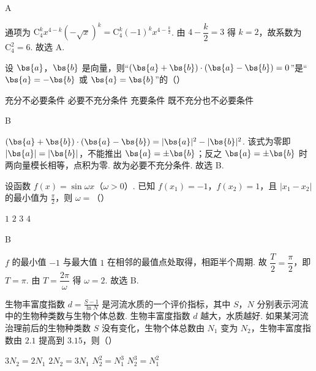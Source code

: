 \begin{answer}
A
\end{answer}

\begin{solution}
通项为 \(\mathrm C_4^k x^{4-k}(-\sqrt{x})^k=\mathrm C_4^k(-1)^k x^{4-\frac{k}{2}}\). 由 \(4-\dfrac{k}{2}=3\) 得 \(k=2\)，故系数为 \(\mathrm C_4^2=6\). 故选 A.
\end{solution}

\begin{problem}
设 \(\bs{a}\)，\(\bs{b}\) 是向量，则“\(\left( \bs{a}+\bs{b} \right)\cdot\left( \bs{a}-\bs{b} \right)=0\)”是“\(\bs{a}=-\bs{b}\) 或 \(\bs{a}=\bs{b}\)”的（\quad）

\choices
    {充分不必要条件}
    {必要不充分条件}
    {充要条件}
    {既不充分也不必要条件}
\end{problem}

\begin{answer}
B
\end{answer}

\begin{solution}
\(\left(\bs{a}+\bs{b}\right)\cdot\left(\bs{a}-\bs{b}\right)=|\bs{a}|^2-|\bs{b}|^2\). 该式为零即 \(|\bs{a}|=|\bs{b}|\)，不能推出 \(\bs{a}=\pm\bs{b}\)；反之 \(\bs{a}=\pm\bs{b}\) 时两向量模长相等，点积为零. 故为必要不充分条件. 故选 B.
\end{solution}

\begin{problem}
设函数 \(f(x)=\sin \omega x\)（\(\omega>0\)）. 已知 \(f(x_1)=-1\)，\(f(x_2)=1\)，且 \(\lvert x_1-x_2\rvert\) 的最小值为 \(\frac{\pi}{2}\)，则 \(\omega=\)（\quad）

\choices
    {\(1\)}
    {\(2\)}
    {\(3\)}
    {\(4\)}
\end{problem}

\begin{answer}
B
\end{answer}

\begin{solution}
\(f\) 的最小值 \(-1\) 与最大值 \(1\) 在相邻的最值点处取得，相距半个周期. 故 \(\dfrac{T}{2}=\dfrac{\pi}{2}\)，即 \(T=\pi\). 由 \(T=\dfrac{2\pi}{\omega}\) 得 \(\omega=2\). 故选 B.
\end{solution}

\begin{problem}
生物丰富度指数 \(d=\frac{S-1}{\ln N}\) 是河流水质的一个评价指标，其中 \(S\)，\(N\) 分别表示河流中的生物种类数与生物个体总数. 生物丰富度指数 \(d\) 越大，水质越好. 如果某河流治理前后的生物种类数 \(S\) 没有变化，生物个体总数由 \(N_1\) 变为 \(N_2\)，生物丰富度指数由 \(2.1\) 提高到 \(3.15\)，则（\quad）

\choices
    {\(3N_2=2N_1\)}
    {\(2N_2=3N_1\)}
    {\(N_2^2=N_1^3\)}
    {\(N_2^3=N_1^2\)}
\end{problem}

